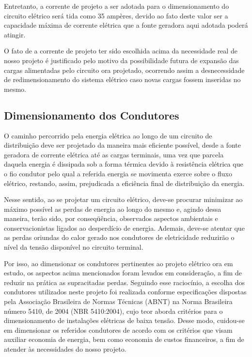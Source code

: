 	Entretanto, a corrente de projeto a ser adotada para o dimensionamento do circuito elétrico será tida como 35 ampères, devido ao fato deste valor ser a capacidade máxima de corrente elétrica que a fonte geradora aqui adotada poderá atingir.
	
	O fato de a corrente de projeto ter sido escolhida acima da necessidade real de nosso projeto é justificado pelo motivo da possibilidade futura de expansão das cargas alimentadas pelo circuito ora projetado, ocorrendo assim a desnecessidade de redimensionamento do sistema elétrico caso novas cargas fossem inseridas no mesmo.

\subsection{Dimensionamento dos Condutores}

O caminho percorrido pela energia elétrica ao longo de um circuito de distribuição deve ser projetado da maneira mais eficiente possível, desde a fonte geradora de corrente elétrica até as cargas terminais, uma vez que parcela daquela energia é dissipada sob a forma térmica devido à resistência elétrica que o fio condutor pelo qual a referida energia se movimenta exerce sobre o fluxo elétrico, restando, assim, prejudicada a eficiência final de distribuição da energia.

Nesse sentido, ao se projetar um circuito elétrico, deve-se procurar minimizar ao máximo possível as perdas de energia ao longo do mesmo e, agindo dessa maneira, terão sido, por conseqüência, observados aspectos ambientais e conservacionistas ligados ao desperdício de energia. Ademais, deve-se atentar que as perdas oriundas do calor gerado nos condutores de eletricidade reduzirão o nível da tensão disponível no circuito terminal.

Por isso, ao dimensionar os condutores pertinentes ao projeto elétrico ora em estudo, os aspectos acima mencionados foram levados em consideração, a fim de reduzir na prática as supracitadas perdas.
Seguindo esse raciocínio, a escolha dos condutores utilizados neste projeto foi realizada conforme especificações dispostas pela Associação Brasileira de Normas Técnicas (ABNT) na Norma Brasileira número 5410, de 2004 (NBR 5410:2004), cujo teor aborda critérios para o dimensionamento de instalações elétricas de baixa tensão. 
Desse modo, cuidou-se em dimensionar os referidos condutores de acordo com os critérios que visam auxiliar economia de energia, bem como economia de custos financeiros, a fim de atender às necessidades do nosso projeto.

